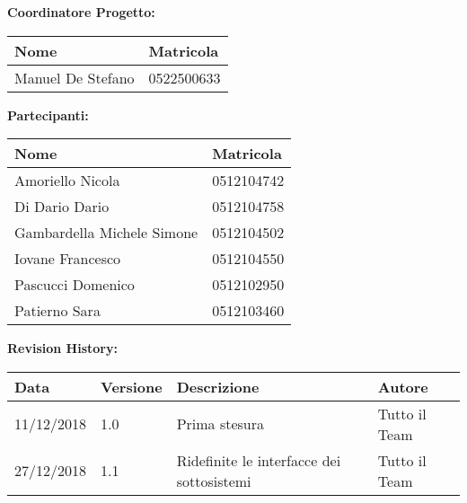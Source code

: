 \textbf{Coordinatore Progetto:}
	\begin{table}[h]
		\centering
		\begin{tabularx}{0.9\textwidth}{|X|X|}
			\hline
			\textbf{Nome}     & \textbf{Matricola} \\ \hline
			Manuel De Stefano &  0522500633\\ \hline
		\end{tabularx}
	\end{table}

	\vspace{0.5cm}
	
	\textbf{Partecipanti:}
	\begin{table}[h]
		\centering
		\begin{tabularx}{0.9\textwidth}{|X|X|}
			\hline
			\textbf{Nome}     & \textbf{Matricola} \\ \hline
			Amoriello Nicola &  0512104742\\ \hline
			Di Dario Dario &  0512104758\\ \hline
			Gambardella Michele Simone &  0512104502\\ \hline
			Iovane Francesco &  0512104550\\ \hline
			Pascucci Domenico &  0512102950\\ \hline
			Patierno Sara &  0512103460\\ \hline
		\end{tabularx}
	\end{table}

	\textbf{Revision History:}
	\begin{table}[h]
		\centering
		\begin{tabularx}{0.9\textwidth}{|p{2cm}|l|X|p{3cm}|}
			\hline
			\textbf{Data} & \textbf{Versione} & \textbf{Descrizione} & \textbf{Autore} \\ \hline
			11/12/2018 & 1.0 & Prima stesura & Tutto il Team \\ \hline
			27/12/2018 & 1.1 & Ridefinite le interfacce dei sottosistemi & Tutto il Team \\ \hline
		\end{tabularx}
	\end{table}